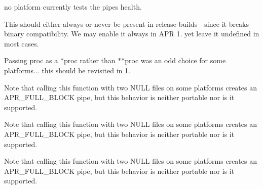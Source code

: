 \begin{DoxyRefList}
no platform currently tests the pipes health.  
\item[\label{bug__bug000011}%
\hypertarget{bug__bug000011}{}%
Global \hyperlink{structapr__proc__t_a72ed1c58c3f08ffa7202fa80e870cd54}{apr\-\_\-proc\-\_\-t\-:\-:invoked} ]This should either always or never be present in release builds -\/ since it breaks binary compatibility. We may enable it always in A\-P\-R 1. yet leave it undefined in most cases.  
\item[\label{bug__bug000009}%
\hypertarget{bug__bug000009}{}%
Global \hyperlink{group__apr__thread__proc_ga506183074e8413c3ff597539e4768ea4}{apr\-\_\-proc\-\_\-wait\-\_\-all\-\_\-procs} (\hyperlink{structapr__proc__t}{apr\-\_\-proc\-\_\-t} $\ast$proc, int $\ast$exitcode, apr\-\_\-exit\-\_\-why\-\_\-e $\ast$exitwhy, apr\-\_\-wait\-\_\-how\-\_\-e waithow, apr\-\_\-pool\-\_\-t $\ast$p)]Passing proc as a $\ast$proc rather than $\ast$$\ast$proc was an odd choice for some platforms... this should be revisited in 1.  
\item[\label{bug__bug000008}%
\hypertarget{bug__bug000008}{}%
Global \hyperlink{group__apr__thread__proc_ga6fad364c6c820e37c0915435cfb3921f}{apr\-\_\-procattr\-\_\-child\-\_\-err\-\_\-set} (struct apr\-\_\-procattr\-\_\-t $\ast$attr, apr\-\_\-file\-\_\-t $\ast$child\-\_\-err, apr\-\_\-file\-\_\-t $\ast$parent\-\_\-err)]Note that calling this function with two N\-U\-L\-L files on some platforms creates an A\-P\-R\-\_\-\-F\-U\-L\-L\-\_\-\-B\-L\-O\-C\-K pipe, but this behavior is neither portable nor is it supported. 
\item[\label{bug__bug000006}%
\hypertarget{bug__bug000006}{}%
Global \hyperlink{group__apr__thread__proc_ga24f40119b1aa07dd45a681a44915cb1b}{apr\-\_\-procattr\-\_\-child\-\_\-in\-\_\-set} (struct apr\-\_\-procattr\-\_\-t $\ast$attr, apr\-\_\-file\-\_\-t $\ast$child\-\_\-in, apr\-\_\-file\-\_\-t $\ast$parent\-\_\-in)]Note that calling this function with two N\-U\-L\-L files on some platforms creates an A\-P\-R\-\_\-\-F\-U\-L\-L\-\_\-\-B\-L\-O\-C\-K pipe, but this behavior is neither portable nor is it supported. 
\item[\label{bug__bug000007}%
\hypertarget{bug__bug000007}{}%
Global \hyperlink{group__apr__thread__proc_gabb97e9a49021ab4452ae3f1a281c977f}{apr\-\_\-procattr\-\_\-child\-\_\-out\-\_\-set} (struct apr\-\_\-procattr\-\_\-t $\ast$attr, apr\-\_\-file\-\_\-t $\ast$child\-\_\-out, apr\-\_\-file\-\_\-t $\ast$parent\-\_\-out)]Note that calling this function with two N\-U\-L\-L files on some platforms creates an A\-P\-R\-\_\-\-F\-U\-L\-L\-\_\-\-B\-L\-O\-C\-K pipe, but this behavior is neither portable nor is it supported. 
$$
\end{DoxyRefList}
